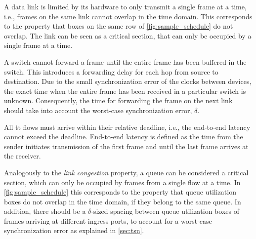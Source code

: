\begin{description}[leftmargin=0cm]
   \item[Link congestion.] A data link is limited by its hardware to only transmit a single frame at a time, i.e., frames on the same link cannot overlap in the time domain. This corresponds to the property that boxes on the same row of \autoref{fig:sample_schedule} do not overlap. The link can be seen as a critical section, that can only be occupied by a single frame at a time.
   \item[Flow transmission.] A switch cannot forward a frame until the entire frame has been buffered in the switch.
This introduces a forwarding delay for each hop from source to destination. Due to the small synchronization error of the clocks between devices, the exact time when the entire frame has been received in a particular switch is unknown.
Consequently, the time for forwarding the frame on the next link should take into account the worst-case synchronization error, $\delta$.
   \item[Bounded end-to-end latency.] All \gls{tt} flows must arrive within their relative deadline, i.e., the end-to-end latency cannot exceed the deadline. End-to-end latency is defined as the time from the sender initiates transmission of the first frame and until the last frame arrives at the receiver.
   \item[Deterministic queues.] Analogously to the \emph{link congestion} property, a queue can be considered a critical section, which can only be occupied by frames from a single flow at a time. In \autoref{fig:sample_schedule} this corresponds to the property that queue utilization boxes do not overlap in the time domain, if they belong to the same queue. In addition, there should be a $\delta$-sized spacing between queue utilization boxes of frames arriving at different ingress ports, to account for a worst-case synchronization error as explained in \autoref{sec:tsn}.
\end{description}

